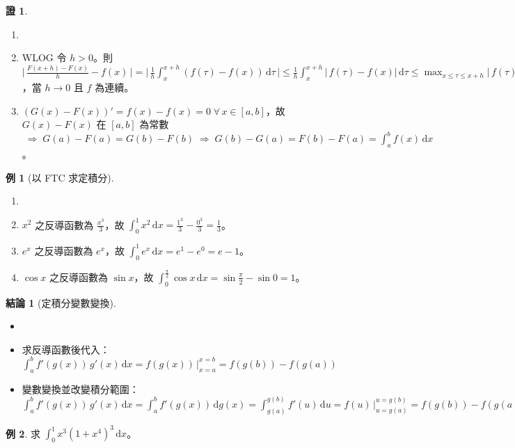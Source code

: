 \documentclass[12pt]{extarticle}
\newcommand{\ds}{\displaystyle}
\newcommand{\ie}{\;\Longrightarrow\;}
\theoremstyle{definition}
\newtheorem*{fact}{結論}
\newtheorem*{ex}{例}
\newtheorem*{prf}{證}
\begin{document}
\begin{prf}
  \begin{enumerate}\setlength{\itemsep}{0pt}
    \item[]
    \item WLOG 令 $h > 0$。則 $\ds\Bigg|\,\frac{F(x + h) - F(x)}{h} - f(x)\,\Bigg| = \Bigg|\,\frac{1}{h}\int_x^{x + h}(f(\tau) - f(x))\,\mathrm{d}\tau\,\Bigg| \leqslant\frac{1}{h}\int_x^{x + h}\big|\,f(\tau) - f(x)\big|\,\mathrm{d}\tau \leqslant\max_{x\leqslant\tau\leqslant x+h}\big|\,f(\tau) - f(x)\big|\to 0$，當 $h\to 0$ 且 $f$ 為連續。
    \item $\ds(G(x) - F(x))' = f(x) - f(x) = 0\;\forall\,x\in[a, b]$，故 $\ds G(x) - F(x)$ 在 $[a, b]$ 為常數 $\ds\ie G(a) - F(a) = G(b) - F(b) \ie G(b) - G(a) = F(b) - F(a) = \int_a^b f(x)\,\mathrm{d}x$。
  \end{enumerate}
\end{prf}

\begin{ex}[以 FTC 求定積分]
  \begin{enumerate}\setlength{\itemsep}{0pt}
    \item[]
    \item $\ds x^2$ 之反導函數為 $\ds\frac{x^3}{3}$，故 $\ds\int_0^1 x^2\,\text{d}x = \frac{1^3}{3} - \frac{0^3}{3} = \frac{1}{3}$。
    \item $\ds e^x$ 之反導函數為 $\ds e^x$，故 $\ds\int_0^1 e^x\,\text{d}x = e^1 - e^0 = e - 1$。
    \item $\cos x$ 之反導函數為 $\sin x$，故 $\ds\int_0^{\frac{\pi}{2}}\cos x\,\mathrm{d}x = \sin\frac{\pi}{2} - \sin 0 = 1$。
  \end{enumerate}
\end{ex}

\begin{fact}[定積分變數變換]
  \begin{itemize}\setlength{\itemsep}{0pt}
    \item[]
    \item 求反導函數後代入：$\ds\int_a^b f'(g(x))\,g'(x)\,\text{d}x = f(g(x))\,\Big|_{x = a}^{x = b} = f(g(b)) - f(g(a))$
    \item 變數變換並改變積分範圍：$\ds\int_a^b f'(g(x))\,g'(x)\,\text{d}x = \int_a^b f'(g(x))\,\text{d}g(x) =\int_{g(a)}^{g(b)} f'(u)\,\text{d}u = f(u)\,\Big|_{u = g(a)}^{u = g(b)} = f(g(b)) - f(g(a))$
  \end{itemize}
\end{fact}

\begin{ex}
  求 $\ds\int_0^1 x^3(1 + x^4)^3\,\text{d}x$。
\end{ex}
\end{document}
